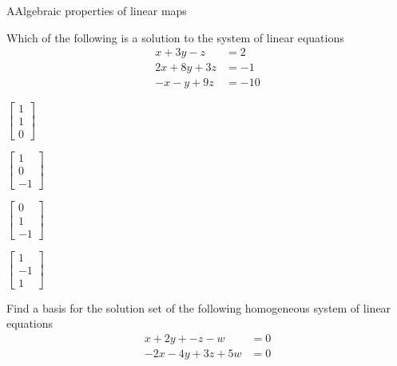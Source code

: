 \documentclass{article}
\begin{document}
\begin{module}{A}{Algebraic properties of linear maps}




\begin{readinessAssuranceTest}
\setcounter{enumi}{20}
\item Which of the following is a solution to the system of linear equations
      \begin{align*}
      x+3y-z    &=   2  \\
      2x+8y+3z  &=  -1  \\
      -x-y+9z   &= -10
      \end{align*}

\begin{multicols}{4}
\begin{readinessAssuranceTestChoices}
\item $\begin{bmatrix} 1 \\ 1 \\ 0 \end{bmatrix}$
\item $\begin{bmatrix} 1 \\ 0 \\ -1 \end{bmatrix}$%
\item $\begin{bmatrix} 0 \\ 1 \\ -1 \end{bmatrix}$
\item $\begin{bmatrix} 1 \\ -1 \\ 1 \end{bmatrix}$
\end{readinessAssuranceTestChoices}
\end{multicols}


\item Find a basis for the solution set of the following homogeneous system of
      linear equations
      \begin{align*}
      x+2y+-z-w    &= 0 \\
      -2x-4y+3z+5w &= 0
      \end{align*}


\end{readinessAssuranceTest}
\end{module}
\end{document}
